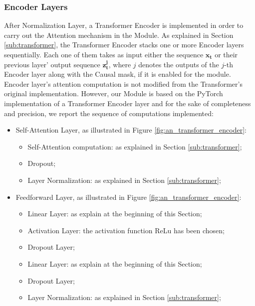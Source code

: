             \subsubsection{Encoder Layers}
                After Normalization Layer, a Transformer Encoder is implemented in order to carry out the Attention mechanism in the Module. As explained in Section \ref{sub:transformer}, the Transformer Encoder stacks one or more Encoder layers sequentially. Each one of them takes as input either the sequence $\mathbf{x_t}$ or their previous layer' output sequence $\mathbf{z_{t}^{j}}$, where $j$ denotes the outputs of the $j$-th Encoder layer along with the Causal mask, if it is enabled for the module. Encoder layer's attention computation is not modified from the Transformer's original implementation. However, our Module is based on the PyTorch implementation of a Transformer Encoder layer and for the sake of completeness and precision, we report the sequence of computations implemented:
                
                \begin{itemize}
                \setlength\itemsep{0.05em}
                    \item Self-Attention Layer, as illustrated in Figure \ref{fig:an_transformer_encoder}:
                    \begin{itemize}
                        \setlength\itemsep{0.05em}
                        \item Self-Attention computation: as explained in Section \ref{sub:transformer};
                        \item Dropout;
                        \item Layer Normalization: as explained in Section \ref{sub:transformer};
                    \end{itemize}
                    \item Feedforward Layer, as illustrated in Figure \ref{fig:an_transformer_encoder}:
                    \begin{itemize}
                        \setlength\itemsep{0.05em}
                        \item Linear Layer: as explain at the beginning of this Section;
                        \item Activation Layer: the activation function ReLu has been chosen;
                        \item Dropout Layer;
                        \item Linear Layer: as explain at the beginning of this Section;
                        \item Dropout Layer;
                        \item Layer Normalization: as explained in Section \ref{sub:transformer};
                    \end{itemize}
                \end{itemize}
                
